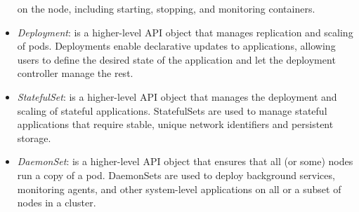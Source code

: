 \begin{itemize}
    on the node, including starting, stopping, and monitoring containers.
  \item \textit{Deployment}: is a higher-level API object that manages
    replication and scaling of pods. Deployments enable declarative updates to
    applications, allowing users to define the desired state of the application
    and let the deployment controller manage the rest.
  \item \textit{StatefulSet}: is a higher-level API object that manages the
    deployment and scaling of stateful applications. StatefulSets are used to
    manage stateful applications that require stable, unique network identifiers
    and persistent storage.
  \item \textit{DaemonSet}: is a higher-level API object that ensures that all
    (or some) nodes run a copy of a pod. DaemonSets are used to deploy
    background services, monitoring agents, and other system-level applications
    on all or a subset of nodes in a cluster.
\end{itemize}
